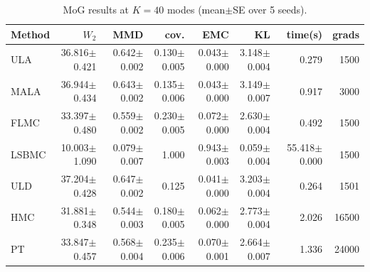 \begin{table}[t]
\centering
\small
\caption{MoG results at $K=40$ modes (mean$\pm$SE over 5 seeds).}
\label{tab:mog_K40}
\begin{tabular}{lrrrrrrr}
\toprule
Method & $W_2$ & MMD & cov. & EMC & KL & time(s) & grads \\
\midrule
ULA & 36.816$\pm$0.421 & 0.642$\pm$0.002 & 0.130$\pm$0.005 & 0.043$\pm$0.000 & 3.148$\pm$0.004 & 0.279 & 1500 \\
MALA & 36.944$\pm$0.434 & 0.643$\pm$0.002 & 0.135$\pm$0.006 & 0.043$\pm$0.000 & 3.149$\pm$0.007 & 0.917 & 3000 \\
FLMC & 33.397$\pm$0.480 & 0.559$\pm$0.002 & 0.230$\pm$0.005 & 0.072$\pm$0.000 & 2.630$\pm$0.004 & 0.492 & 1500 \\
LSBMC & 10.003$\pm$1.090 & 0.079$\pm$0.007 & 1.000 & 0.943$\pm$0.003 & 0.059$\pm$0.004 & 55.418$\pm$0.000 & 1500 \\
ULD & 37.204$\pm$0.428 & 0.647$\pm$0.002 & 0.125 & 0.041$\pm$0.000 & 3.203$\pm$0.004 & 0.264 & 1501 \\
HMC & 31.881$\pm$0.348 & 0.544$\pm$0.003 & 0.180$\pm$0.005 & 0.062$\pm$0.000 & 2.773$\pm$0.004 & 2.026 & 16500 \\
PT & 33.847$\pm$0.457 & 0.568$\pm$0.004 & 0.235$\pm$0.006 & 0.070$\pm$0.001 & 2.664$\pm$0.007 & 1.336 & 24000 \\
\bottomrule
\end{tabular}
\end{table}